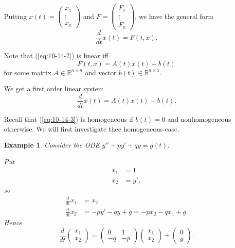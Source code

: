 \documentclass{tufte-handout}
\newcommand*\R{\mathbb{R}}
\newtheorem{ex}[thm]{Example}
\theoremstyle{definition}
\begin{document}
Putting $x(t) = \begin{pmatrix}
x_1 \\
\vdots \\
x_n
\end{pmatrix} $ and $F = \begin{pmatrix}
F_1 \\
\vdots \\
F_n
\end{pmatrix} $, we have the general form 
\begin{equation}
	\frac{d}{dt} x(t) = F(t,x) \label{eq:10-14-2}.
\end{equation}

Note that (\ref{eq:10-14-2}) is linear iff \[
	F(t,x) = A(t)x(t) + b(t)
\] for some matrix $A \in \R^{n \times n}$ and vector $b(t) \in \R^{n \times 1}$. 

We get a first order linear system
\begin{equation}
	\frac{d}{dt}x(t) = A(t) x(t) + b(t) \label{eq:10-14-3}.
\end{equation}

Recall that (\ref{eq:10-14-3}) is homogeneous if $b(t) = 0$ and nonhomogeneous otherwise. We will first investigate thee homogeneous case.

\begin{ex}
	Consider the ODE $y'' + py' + qy = g(t)$. 

	Put
	\begin{align*}
		x_1 &=  1 \\
		x_2 &= y'
	,\end{align*}	so
	\begin{align*}
		\frac{d}{dt} x_1 &= x_2 \\
		\frac{d}{dt}x_2 &= -py'-qy+g = -px_2 - qx_1 + g
	.\end{align*}
	Hence \[
		\frac{d}{dt} \begin{pmatrix}
		x_1  \\
		x_2
		\end{pmatrix} = \begin{pmatrix}
		0 & 1 \\
		-q &-p
		\end{pmatrix} \begin{pmatrix}
		x_1 \\
		x_2
		\end{pmatrix} + \begin{pmatrix}
		0  \\
		g
		\end{pmatrix} 
	.\] 
\end{ex}
\end{document}
